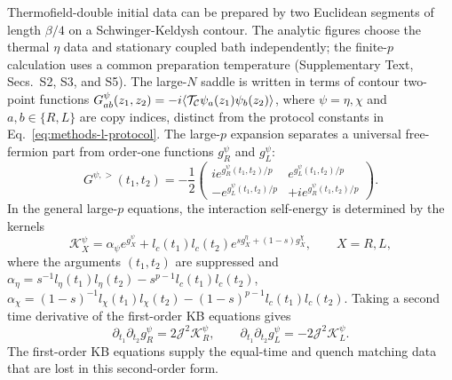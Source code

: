 \documentclass[pdflatex,sn-nature]{sn-jnl}
\begin{document}
Thermofield-double initial data can be prepared by two Euclidean segments of length \(\beta/4\) on a Schwinger-Keldysh contour. The analytic figures choose the thermal \(\eta\) data and stationary coupled bath independently; the finite-\(p\) calculation uses a common preparation temperature (Supplementary Text, Secs.~S2, S3, and S5). The large-\(N\) saddle is written in terms of contour two-point functions \(G^\psi_{ab}(z_1,z_2)=-i\langle{\cal T}_{\cal C}\psi_a(z_1)\psi_b(z_2)\rangle\), where \(\psi=\eta,\chi\) and \(a,b\in\{R,L\}\) are copy indices, distinct from the protocol constants in Eq.~\eqref{eq:methods-l-protocol}. The large-\(p\) expansion separates a universal free-fermion part from order-one functions \(g^\psi_R\) and \(g^\psi_L\):
\begin{equation}
G^{\psi,>}(t_1,t_2)=-\frac{1}{2}
\left(\begin{array}{cc}
i e^{g^\psi_R(t_1,t_2)/p} & e^{g^\psi_L(t_1,t_2)/p}\\
-e^{g^\psi_L(t_1,t_2)/p} & +i e^{g^\psi_R(t_1,t_2)/p}
\end{array}\right).
\label{eq:methods-large-p-ansatz}
\end{equation}
In the general large-\(p\) equations, the interaction self-energy is determined by the kernels
\begin{equation}
\mathcal K^\psi_X
=
\alpha_\psi e^{g^\psi_X}
+l_c(t_1)l_c(t_2)
e^{s g^\eta_X+(1-s)g^\chi_X},
\qquad X=R,L ,
\label{eq:methods-large-p-kernel}
\end{equation}
where the arguments \((t_1,t_2)\) are suppressed and
\(\alpha_\eta=s^{-1}l_\eta(t_1)l_\eta(t_2)-s^{p-1}l_c(t_1)l_c(t_2)\),
\(\alpha_\chi=(1-s)^{-1}l_\chi(t_1)l_\chi(t_2)-(1-s)^{p-1}l_c(t_1)l_c(t_2)\).
Taking a second time derivative of the first-order KB equations gives
\begin{equation}
\partial_{t_1}\partial_{t_2}g^\psi_R=2\mathcal J^2\mathcal K^\psi_R,
\qquad
\partial_{t_1}\partial_{t_2}g^\psi_L=-2\mathcal J^2\mathcal K^\psi_L .
\label{eq:methods-large-p-liouville}
\end{equation}
The first-order KB equations supply the equal-time and quench matching data that are lost in this second-order form.
\end{document}
